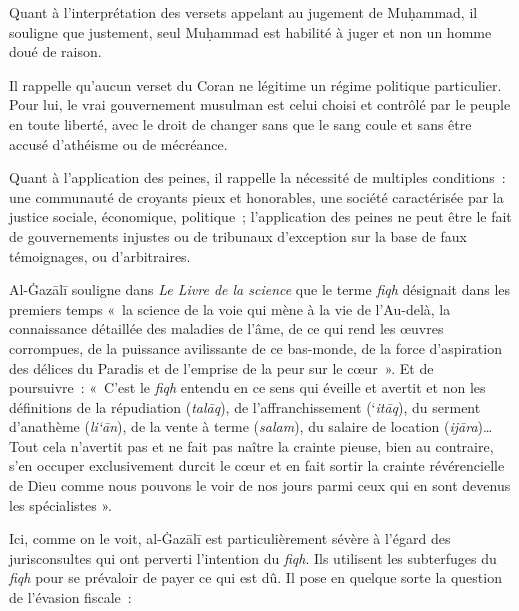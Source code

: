 Quant à l'interprétation des versets appelant au jugement de Muḥammad,
il souligne que justement, seul Muḥammad est habilité à juger et non un
homme doué de raison.

Il rappelle qu'aucun verset du Coran ne légitime un régime politique
particulier. Pour lui, le vrai gouvernement musulman est celui choisi et
contrôlé par le peuple en toute liberté, avec le droit de changer sans
que le sang coule et sans être accusé d'athéisme ou de mécréance.

Quant à l'application des peines, il rappelle la nécessité de multiples
conditions~: une communauté de croyants pieux et honorables, une société
caractérisée par la justice sociale, économique, politique~;
l'application des peines ne peut être le fait de gouvernements injustes
ou de tribunaux d'exception sur la base de faux témoignages, ou
d'arbitraires.


Al-Ġazālī \label{theol:AlGazali22} souligne dans \emph{Le Livre de la science} que le terme
\emph{fiqh} désignait dans les premiers temps «~la science de la voie
qui mène à la vie de l'Au-delà, la connaissance détaillée des maladies
de l'âme, de ce qui rend les œuvres corrompues, de la puissance
avilissante de ce bas-monde, de la force d'aspiration des délices du
Paradis et de l'emprise de la peur sur le cœur~». Et de poursuivre~:
«~C'est le \emph{fiqh} entendu en ce sens qui éveille et avertit et non
les définitions de la répudiation (\emph{talāq}), de l'affranchissement
(`\emph{itāq}), du serment d'anathème (\emph{li`ān}), de la vente à
terme (\emph{salam}), du salaire de location (\emph{ijāra})\ldots{} Tout
cela n'avertit pas et ne fait pas naître la crainte pieuse, bien au
contraire, s'en occuper exclusivement durcit le cœur et en fait sortir
la crainte révérencielle de Dieu comme nous pouvons le voir de nos jours
parmi ceux qui en sont devenus les spécialistes ».

Ici, comme on le voit, al-Ġazālī est particulièrement sévère à l'égard
des jurisconsultes qui ont perverti l'intention du \emph{fiqh}. Ils
utilisent les subterfuges du \emph{fiqh} pour se prévaloir de payer ce
qui est dû. Il pose en quelque sorte la question de l'évasion fiscale~:

